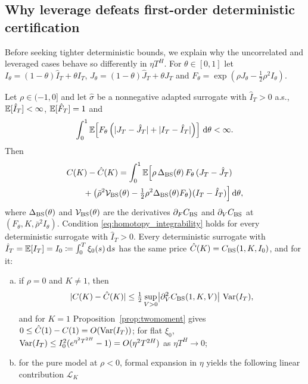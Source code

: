 \subsection{Why leverage defeats first-order deterministic certification}
\label{sec:homotopy}

Before seeking tighter deterministic bounds, we explain why the uncorrelated and leveraged cases behave so differently in $\eta T^H$. For $\theta\in[0,1]$ let $I_\theta=(1-\theta)\hat{I}_T+\theta I_T$, $J_\theta=(1-\theta)\hat{J}_T+\theta J_T$ and $F_\theta=\exp(\rho J_\theta-\tfrac12\rho^2 I_\theta)$.

\begin{theorem}
\label{thm:homotopy}
Let $\rho\in(-1,0]$ and let $\hat{\sigma}$ be a nonnegative adapted surrogate with $\hat{I}_T>0$ a.s., $\mathbb{E}[\hat{I}_T]<\infty$, $\mathbb{E}[\hat{F}_T]=1$ and
\begin{equation}
  \int_0^1\mathbb{E}\!\left[F_\theta\left(|J_T-\hat{J}_T|+|I_T-\hat{I}_T|\right)\right]\,\mathrm{d}\theta<\infty.
  \label{eq:homotopy_integrability}
\end{equation}
Then
\begin{equation}
  \begin{aligned}
  &C(K) - \hat{C}(K) = \int_0^1 \mathbb{E}\Bigl[\rho\,\Delta_{\mathrm{BS}}(\theta)\,F_\theta\,(J_T-\hat{J}_T) \\
  &\qquad + \bigl(\bar{\rho}^2\mathcal{V}_{\mathrm{BS}}(\theta) - \tfrac12\rho^2\Delta_{\mathrm{BS}}(\theta)F_\theta\bigr)(I_T-\hat{I}_T)\Bigr]\,\mathrm{d}\theta,
  \end{aligned}
  \label{eq:homotopy}
\end{equation}
where $\Delta_{\mathrm{BS}}(\theta)$ and $\mathcal{V}_{\mathrm{BS}}(\theta)$ are the derivatives $\partial_F C_{\mathrm{BS}}$ and $\partial_V C_{\mathrm{BS}}$ at $(F_\theta,K,\bar{\rho}^2 I_\theta)$. Condition \eqref{eq:homotopy_integrability} holds for every deterministic surrogate with $\hat{I}_T>0$. Every deterministic surrogate with $\hat{I}_T=\mathbb{E}[I_T]=I_0\coloneqq\int_0^T\xi_0(s)\,\mathrm{d} s$ has the same price $\hat{C}(K)=C_{\mathrm{BS}}(1,K,I_0)$, and for it:
\begin{enumerate}[(a)]
  \item if $\rho=0$ and $K\ne1$, then
  \[
    |C(K)-\hat{C}(K)|\le\tfrac12\sup_{V>0}\bigl|\partial_V^2C_{\mathrm{BS}}(1,K,V)\bigr|\,\operatorname{Var}(I_T),
  \]
  and for $K=1$ Proposition~\ref{prop:twomoment} gives $0\le\hat{C}(1)-C(1)=O(\operatorname{Var}(I_T))$; for flat $\xi_0$, $\operatorname{Var}(I_T)\le I_0^2(e^{\eta^2T^{2H}}-1)=O(\eta^2T^{2H})$ as $\eta T^H\to0$;
  \item for the pure model at $\rho<0$, formal expansion in $\eta$ yields the following linear contribution $\mathcal{L}_K$

\end{enumerate}
\end{theorem}
